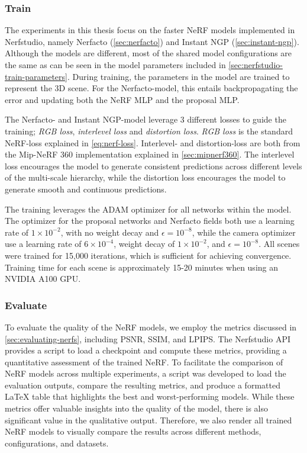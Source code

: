 \subsubsection{Train}

The experiments in this thesis focus on the faster NeRF models implemented in Nerfstudio, namely Nerfacto (\autoref{sec:nerfacto}) and Instant NGP (\autoref{sec:instant-ngp}). Although the models are different, most of the shared model configurations are the same as can be seen in the model parameters included in \autoref{sec:nerfstudio-train-parameters}. During training, the parameters in the model are trained to represent the 3D scene. For the Nerfacto-model, this entails backpropagating the error and updating both the NeRF MLP and the proposal MLP.

The Nerfacto- and Instant NGP-model leverage 3 different losses to guide the training; \textit{RGB loss}, \textit{interlevel loss} and \textit{distortion loss}. \textit{RGB loss} is the standard NeRF-loss explained in \autoref{eq:nerf-loss}. Interlevel- and distortion-loss are both from the Mip-NeRF 360 implementation explained in \autoref{sec:mipnerf360}. The interlevel loss encourages the model to generate consistent predictions across different levels of the multi-scale hierarchy, while the distortion loss encourages the model to generate smooth and continuous predictions.

The training leverages the ADAM optimizer for all networks within the model. The optimizer for the proposal networks and Nerfacto fields both use a learning rate of $1 \times 10^{-2}$, with no weight decay and $\epsilon=10^{-8}$, while the camera optimizer use a learning rate of $6 \times 10^{-4}$, weight decay of $1 \times 10^{-2}$, and $\epsilon=10^{-8}$. All scenes were trained for 15,000 iterations, which is sufficient for achieving convergence. Training time for each scene is approximately 15-20 minutes when using an NVIDIA A100 GPU.

\subsubsection{Evaluate}

To evaluate the quality of the NeRF models, we employ the metrics discussed in \autoref{sec:evaluating-nerfs}, including PSNR, SSIM, and LPIPS. The Nerfstudio API provides a script to load a checkpoint and compute these metrics, providing a quantitative assessment of the trained NeRF. To facilitate the comparison of NeRF models across multiple experiments, a script was developed to load the evaluation outputs, compare the resulting metrics, and produce a formatted LaTeX table that highlights the best and worst-performing models. While these metrics offer valuable insights into the quality of the model, there is also significant value in the qualitative output. Therefore, we also render all trained NeRF models to visually compare the results across different methods, configurations, and datasets.

